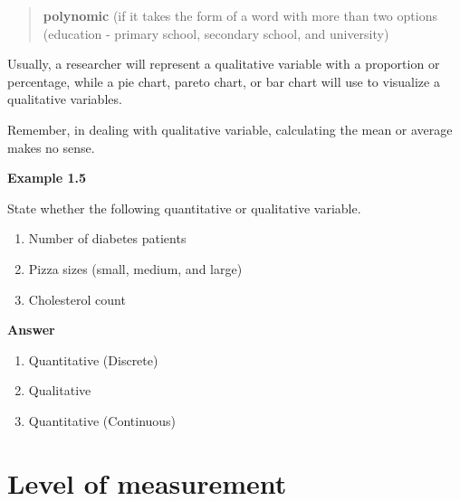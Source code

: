 \documentclass[
  a4paper,
  DIV=11,
  numbers=noendperiod,
  oneside]{scrreprt}
\providecommand{\tightlist}{%
  \setlength{\itemsep}{0pt}\setlength{\parskip}{0pt}}\usepackage{longtable,booktabs,array}
\begin{document}
\begin{quote}
\textbf{polynomic} (if it takes the form of a word with more than two
options (education - primary school, secondary school, and university)
\end{quote}

Usually, a researcher will represent a qualitative variable with a
proportion or percentage, while a pie chart, pareto chart, or bar chart
will use to visualize a qualitative variables.

\begin{tcolorbox}[enhanced jigsaw, arc=.35mm, bottomtitle=1mm, coltitle=black, colbacktitle=quarto-callout-note-color!10!white, rightrule=.15mm, colframe=quarto-callout-note-color-frame, toptitle=1mm, opacityback=0, colback=white, breakable, titlerule=0mm, title=\textcolor{quarto-callout-note-color}{\faInfo}\hspace{0.5em}{Note}, opacitybacktitle=0.6, leftrule=.75mm, bottomrule=.15mm, toprule=.15mm, left=2mm]

{Remember, in dealing with qualitative variable, calculating the mean or
average makes no sense.}

\end{tcolorbox}

{\textbf{Example 1.5}}

State whether the following quantitative or qualitative variable.

\begin{enumerate}
\def\labelenumi{\alph{enumi})}
\tightlist
\item
  Number of diabetes patients
\item
  Pizza sizes (small, medium, and large)
\item
  Cholesterol count
\end{enumerate}

{\textbf{Answer}}

\begin{enumerate}
\def\labelenumi{\alph{enumi})}
\tightlist
\item
  Quantitative (Discrete)
\item
  Qualitative
\item
  Quantitative (Continuous)
\end{enumerate}

\hypertarget{level-of-measurement}{%
\section{Level of measurement}\label{level-of-measurement}}
\end{document}
